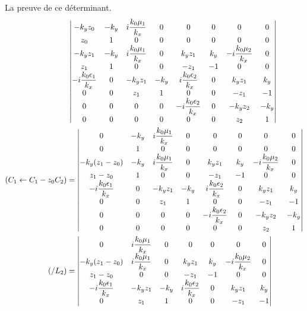 {\begin{itshape}
  La preuve de ce déterminant.
  \begin{align*}
  &{\,}
  \begin{vmatrix}
  -{k_y}z_0 &  -{k_y} & i\dfrac{k_0\mu_1}{k_x} & 0 & 0 & 0 & 0 & 0
  \\
  z_0 & 1 & 0 & 0 & 0 & 0 & 0 & 0
  \\
  -{k_y} z_1 & - {k_y} & i\dfrac{k_0\mu_1}{k_x} & 0 & k_y z_1 & k_y & -i\dfrac{k_0\mu_2}{k_x} & 0
  \\
  z_1 & 1 & 0 & 0 & -z_1 & -1 & 0 & 0
  \\
  -i\dfrac{k_0\epsilon_1}{k_x} & 0 & -k_y z_1 & - k_y & i\dfrac{k_0\epsilon_2}{k_x} & 0 & k_y z_1 & k_y
  \\
  0 & 0 & z_1 & 1 & 0 & 0 & -z_1 & -1
  \\
  0 & 0 & 0 & 0 & -i\dfrac{k_0\epsilon_2}{k_x} & 0 & -k_y z_2 & -k_y
  \\
  0 & 0 & 0 & 0 & 0 & 0 & z_2 & 1
  \end{vmatrix}
  \\
  (C_1 \leftarrow C_1 - z_0 C_2 )&=
  \begin{vmatrix}
  0 & -{k_y} & i\dfrac{k_0\mu_1}{k_x} & 0 & 0 & 0 & 0 & 0
  \\
  0 & 1 & 0 & 0 & 0 & 0 & 0 & 0
  \\
  -{k_y} (z_1-z_0) & - {k_y} & i\dfrac{k_0\mu_1}{k_x} & 0 & k_y z_1 & k_y & -i\dfrac{k_0\mu_2}{k_x} & 0
  \\
  z_1-z_0 & 1 & 0 & 0 & -z_1 & -1 & 0 & 0
  \\
  -i\dfrac{k_0\epsilon_1}{k_x} & 0 & -k_y z_1 & - k_y & i\dfrac{k_0\epsilon_2}{k_x} & 0 & k_y z_1 & k_y
  \\
  0 & 0 & z_1 & 1 & 0 & 0 & -z_1 & -1
  \\
  0 & 0 & 0 & 0 & -i\dfrac{k_0\epsilon_2}{k_x} & 0 & -k_y z_2 & -k_y
  \\
  0 & 0 & 0 & 0 & 0 & 0 & z_2 & 1
  \end{vmatrix}
  \\
  ( / L_2 ) &=
  \begin{vmatrix}
  0 & i\dfrac{k_0\mu_1}{k_x} & 0 & 0 & 0 & 0 & 0
  \\
  -{k_y} (z_1-z_0) &  i\dfrac{k_0\mu_1}{k_x} & 0 & k_y z_1 & k_y & -i\dfrac{k_0\mu_2}{k_x} & 0
  \\
  z_1-z_0 & 0 & 0 & -z_1 & -1 & 0 & 0
  \\
  -i\dfrac{k_0\epsilon_1}{k_x} & -k_y z_1 & - k_y & i\dfrac{k_0\epsilon_2}{k_x} & 0 & k_y z_1 & k_y
  \\
  0 & z_1 & 1 & 0 & 0 & -z_1 & -1
  \\

\end{vmatrix}
\end{align*}
\end{itshape}}
